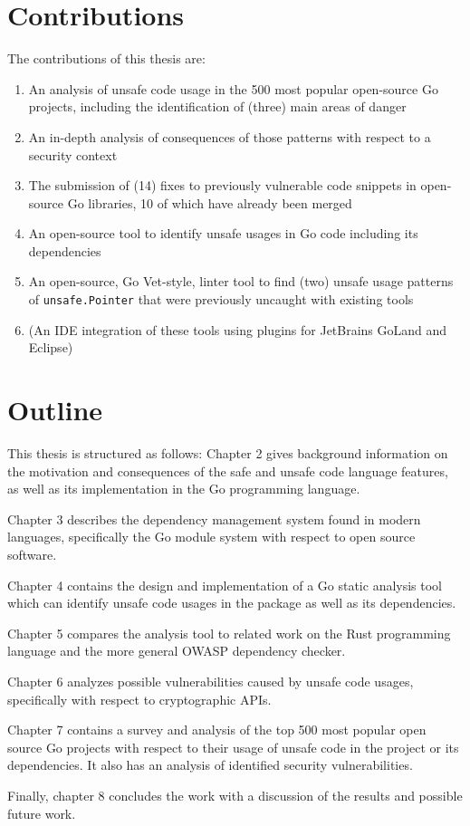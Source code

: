 
\section{Contributions}\label{sec:contributions}

The contributions of this thesis are:

\begin{enumerate}
    \item An analysis of unsafe code usage in the 500 most popular open-source Go projects,
    including the identification of (three) main areas of danger
    \item An in-depth analysis of consequences of those patterns with respect to a security
    context
    \item The submission of (14) fixes to previously vulnerable code snippets in open-source Go
    libraries, 10 of which have already been merged
    \item An open-source tool to identify unsafe usages in Go code including its dependencies
    \item An open-source, Go Vet-style, linter tool to find (two) unsafe usage patterns of \texttt{unsafe.Pointer}
    that were previously uncaught with existing tools
    \item (An IDE integration of these tools using plugins for JetBrains GoLand and Eclipse)
\end{enumerate}




\section{Outline}\label{sec:outline}

This thesis is structured as follows: Chapter 2 gives background information on the motivation
and consequences of the safe and unsafe code language features, as well as its implementation
in the Go programming language.

Chapter 3 describes the dependency management system found in modern languages, specifically
the Go module system with respect to open source software.

Chapter 4 contains the design and implementation of a Go static analysis tool which can identify
unsafe code usages in the package as well as its dependencies.

Chapter 5 compares the analysis tool to related work on the Rust programming language and the
more general OWASP dependency checker.

Chapter 6 analyzes possible vulnerabilities caused by unsafe code usages, specifically with
respect to cryptographic APIs.

Chapter 7 contains a survey and analysis of the top 500 most popular open source Go projects
with respect to their usage of unsafe code in the project or its dependencies. It also has an
analysis of identified security vulnerabilities.

Finally, chapter 8 concludes the work with a discussion of the results and possible future work.